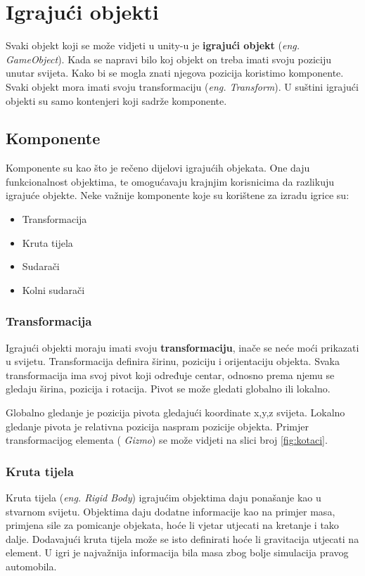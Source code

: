 \section{Igrajući objekti}
Svaki objekt koji se može vidjeti u unity-u je \textbf{igrajući objekt} (\emph{eng. GameObject}). Kada se napravi bilo koj objekt on treba imati svoju poziciju unutar svijeta. Kako bi se mogla znati njegova pozicija koristimo komponente. Svaki objekt mora imati svoju transformaciju (\emph{eng. Transform}). U suštini igrajući objekti su samo kontenjeri koji sadrže komponente.
\subsection{Komponente}
Komponente su kao što je rečeno dijelovi igrajućih objekata. One daju funkcionalnost objektima, te omogućavaju krajnjim korisnicima da razlikuju igrajuće objekte. Neke važnije komponente koje su korištene za izradu igrice su:
\begin{itemize} 
	\item Transformacija
	\item Kruta tijela
	\item Sudarači
	\item Kolni sudarači 
\end{itemize}
\subsubsection{Transformacija}
Igrajući objekti moraju imati svoju \textbf{transformaciju}, inače se neće moći prikazati u svijetu. Transformacija definira širinu, poziciju i orijentaciju objekta. Svaka transformacija ima svoj pivot koji određuje centar, odnosno prema njemu se gledaju širina, pozicija i rotacija. Pivot se može gledati globalno ili lokalno. \par 
Globalno gledanje je pozicija pivota gledajući koordinate x,y,z svijeta. Lokalno gledanje pivota je relativna pozicija naspram pozicije objekta. Primjer transformacijog elementa (\emph{ Gizmo}) se može vidjeti na slici broj \ref{fig:kotaci}.
\newpage
\subsubsection{Kruta tijela}
Kruta tijela (\emph{eng. Rigid Body}) igrajućim objektima daju ponašanje kao u stvarnom svijetu. Objektima daju dodatne informacije kao na primjer masa, primjena sile za pomicanje objekata, hoće li vjetar utjecati na kretanje i tako dalje. Dodavajući kruta tijela može se isto definirati hoće li gravitacija utjecati na element. U igri je najvažnija informacija bila masa zbog bolje simulacija pravog automobila.
